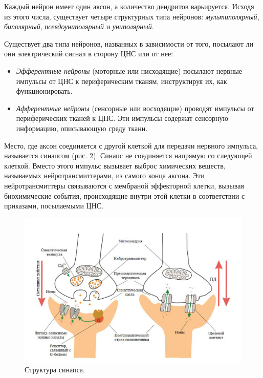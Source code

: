 \documentclass{article}
\begin{document}
        Каждый нейрон имеет один аксон, а количество дендритов варьируется.
        Исходя из этого числа, существует четыре структурных типа нейронов:
        \textit{мультиполярный}, \textit{биполярный}, \textit{псевдоуниполярный} и \textit{униполярный}.
        \vspace*{4mm}

        Существует два типа нейронов, названных в зависимости от того,
        посылают ли они электрический сигнал в сторону ЦНС или от нее:

        \begin{itemize}
            \item \textit{Эфферентные нейроны} (моторные или нисходящие) посылают нервные
            импульсы от ЦНС к периферическим тканям, инструктируя их, как
            функционировать.

            \item \textit{Афферентные нейроны} (сенсорные или восходящие) проводят
            импульсы от периферических тканей к ЦНС. Эти импульсы содержат
            сенсорную информацию, описывающую среду ткани.
        \end{itemize}

        Место, где аксон соединяется с другой клеткой для передачи нервного
        импульса, называется синапсом (рис. 2). Синапс не соединяется напрямую со
        следующей клеткой. Вместо этого импульс вызывает выброс химических
        веществ, называемых нейротрансмиттерами, из самого конца аксона. Эти
        нейротрансмиттеры связываются с мембраной эффекторной клетки, вызывая
        биохимические события, происходящие внутри этой клетки в соответствии с
        приказами, посылаемыми ЦНС.
        \newpage

        \begin{figure}[t]
            \centering
            \includegraphics[width=\textwidth]{data/Синапс.png}
            \caption{Структура синапса.}
        \end{figure}
\end{document}
